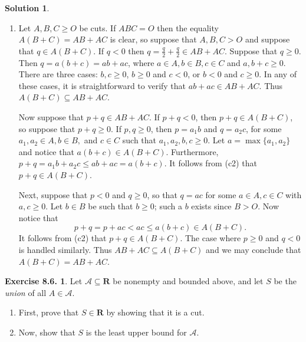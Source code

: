 \documentclass[12pt]{article}
\theoremstyle{definition}
\theoremstyle{exercise}
\newtheorem{exercise}{Exercise 8.6.}
\theoremstyle{solution}
\newtheorem*{solution}{Solution}
\newcommand{\R}{\mathbf{R}}
\begin{document}
\begin{solution}
\begin{enumerate}
        \item Let \( A, B, C \geq O \) be cuts. If \( ABC = O \) then the equality \( A(B + C) = AB + AC \) is clear, so suppose that \( A, B, C > O \) and suppose that \( q \in A(B + C) \). If \( q < 0 \) then \( q = \tfrac{q}{2} + \tfrac{q}{2} \in AB + AC \). Suppose that \( q \geq 0 \). Then \( q = a(b + c) = ab + ac \), where \( a \in A, b \in B, c \in C \) and \( a, b + c \geq 0 \). There are three cases: \( b, c \geq 0 \), \( b \geq 0 \) and \( c < 0 \), or \( b < 0 \) and \( c \geq 0 \). In any of these cases, it is straightforward to verify that \( ab + ac \in AB + AC \). Thus \( A(B + C) \subseteq AB + AC \).

        Now suppose that \( p + q \in AB + AC \). If \( p + q < 0 \), then \( p + q \in A(B + C) \), so suppose that \( p + q \geq 0 \). If \( p, q \geq 0 \), then \( p = a_1 b \) and \( q = a_2 c \), for some \( a_1, a_2 \in A, b \in B, \) and \( c \in C \) such that \( a_1, a_2, b, c \geq 0 \). Let \( a = \max \{ a_1, a_2 \} \) and notice that \( a(b + c) \in A(B + C) \). Furthermore, \( p + q = a_1 b + a_2 c \leq a b + a c = a(b + c) \). It follows from (c2) that \( p + q \in A(B + C) \).
        
        Next, suppose that \( p < 0 \) and \( q \geq 0 \), so that \( q = ac \) for some \( a \in A, c \in C \) with \( a, c \geq 0 \). Let \( b \in B \) be such that \( b \geq 0 \); such a \( b \) exists since \( B > O \). Now notice that
        \[
            p + q = p + ac < ac \leq a(b + c) \in A(B + C).
        \]
        It follows from (c2) that \( p + q \in A(B + C) \). The case where \( p \geq 0 \) and \( q < 0 \) is handled similarly. Thus \( AB + AC \subseteq A(B + C) \) and we may conclude that \( A(B + C) = AB + AC \).
    \end{enumerate}
\end{solution}

\begin{exercise}
\label{ex:8}
    Let \( \mathcal{A} \subseteq \R \) be nonempty and bounded above, and let \( S \) be the \textit{union} of all \( A \in \mathcal{A} \).
    \begin{enumerate}
        \item First, prove that \( S \in \R \) by showing that it is a cut.

        \item Now, show that \( S \) is the least upper bound for \( \mathcal{A} \).
    \end{enumerate}
\end{exercise}
\end{document}
